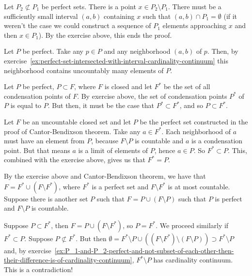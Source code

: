 \documentclass[12pt]{article}
\theoremstyle{definition}
\newenvironment{customthm}[1]
  {\renewcommand\theinnercustomthm{#1}\innercustomthm}
  {\endinnercustomthm}
\begin{document}
\begin{customthm}{I.4.9}\label{ex:P_1-and-P_2-perfect-and-not-subset-of-each-other-then-their-difference-is-of-cardinality-continuum}
    Let $P_2 \not \subset P_1$ be perfect sets. There is a point $x \in P_2 \setminus P_1$. There must be a sufficiently small interval $(a,b)$ containing $x$ such that $(a,b) \cap P_1 = \emptyset$ (if it weren't the case we could construct a sequence of $P_1$ elements approaching $x$ and then $x \in P_1$). By the exercise above, this ends the proof.
\end{customthm}

\begin{customthm}{I.4.10}
    Let $P$ be perfect. Take any $p \in P$ and any neighborhood $(a,b)$ of $p$. Then, by exercise~\ref{ex:perfect-set-intersected-with-interval-cardinality-continuum} this neighborhood contains uncountably many elements of $P$.
\end{customthm}

\begin{customthm}{I.4.11}
    Let $P$ be perfect, $P \subset F$, where $F$ is closed and let $F^*$ be the set of all condensation points of $F$. By exercise above, the set of condensation points $P^*$ of $P$ is equal to $P$. But then, it must be the case that $P^* \subset F^*$, and so $P \subset F^*$.
\end{customthm}

\begin{customthm}{I.4.12}
    Let $F$ be an uncountable closed set and let $P$ be the perfect set constructed in the proof of Cantor-Bendixson theorem. Take any $a \in F^*$. Each neighborhood of $a$ must have an element from $P$, because $F \setminus P$ is countable and $a$ is a condensation point. But that means $a$ is a limit of elements of $P$, hence $a \in P$. So $F^* \subset P$. This, combined with the exercise above, gives us that $F^*=P$.
\end{customthm}

\begin{customthm}{I.4.13}
    By the exercise above and Cantor-Bendixson theorem, we have that $F = F^* \cup (F \setminus F^*)$, where $F^*$ is a perfect set and $F \setminus F^*$ is at most countable. Suppose there is another set $P$ such that $F = P \cup (F \setminus P)$ such that $P$ is perfect and $F \setminus P$ is countable.
    
    Suppose $P \subset F^*$, then $F = P \cup (F \setminus F^*)$, so $P = F^*$. We proceed similarly if $F^* \subset P$. Suppose $P \not\subset F^*$. But then $\emptyset = F^* \setminus P \cup ((F \setminus F^*) \setminus (F \setminus P)) \supset F^* \setminus P$ and, by exercise~\ref{ex:P_1-and-P_2-perfect-and-not-subset-of-each-other-then-their-difference-is-of-cardinality-continuum}, $F^* \setminus P$ has cardinality continuum. This is a contradiction!
\end{customthm}
\end{document}
